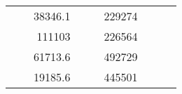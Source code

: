 \begin{table}[H]
\begin{tabular}{|ccrccrccc}
\multicolumn{1}{|c|}{\cellcolor[HTML]{FFFFC7}}                                & \multicolumn{1}{c|}{\cellcolor[HTML]{DAE8FC}}                      & \multicolumn{1}{r|}{\cellcolor[HTML]{DAE8FC}38346.1}   & \multicolumn{1}{c|}{\cellcolor[HTML]{FFFFC7}}                                & \multicolumn{1}{c|}{\cellcolor[HTML]{DAE8FC}}                       & \multicolumn{1}{r|}{\cellcolor[HTML]{DDFDFF}229274}    &                                                                              &                                                                    &                                                        \\ \cline{3-3} \cline{6-6}
\multicolumn{1}{|c|}{\cellcolor[HTML]{FFFFC7}}                                & \multicolumn{1}{c|}{\cellcolor[HTML]{DAE8FC}}                      & \multicolumn{1}{r|}{\cellcolor[HTML]{DDFDFF}111103}    & \multicolumn{1}{c|}{\cellcolor[HTML]{FFFFC7}}                                & \multicolumn{1}{c|}{\cellcolor[HTML]{DAE8FC}}                       & \multicolumn{1}{r|}{\cellcolor[HTML]{DAE8FC}226564}    &                                                                              &                                                                    &                                                        \\ \cline{3-3} \cline{6-6}
\multicolumn{1}{|c|}{\cellcolor[HTML]{FFFFC7}}                                & \multicolumn{1}{c|}{\cellcolor[HTML]{DAE8FC}}                      & \multicolumn{1}{r|}{\cellcolor[HTML]{DAE8FC}61713.6}   & \multicolumn{1}{c|}{\cellcolor[HTML]{FFFFC7}}                                & \multicolumn{1}{c|}{\cellcolor[HTML]{DAE8FC}}                       & \multicolumn{1}{r|}{\cellcolor[HTML]{DDFDFF}492729}    &                                                                              &                                                                    &                                                        \\ \cline{3-3} \cline{6-6}
\multicolumn{1}{|c|}{\cellcolor[HTML]{FFFFC7}}                                & \multicolumn{1}{c|}{\cellcolor[HTML]{DAE8FC}}                      & \multicolumn{1}{r|}{\cellcolor[HTML]{DDFDFF}19185.6}   & \multicolumn{1}{c|}{\cellcolor[HTML]{FFFFC7}}                                & \multicolumn{1}{c|}{\cellcolor[HTML]{DAE8FC}}                       & \multicolumn{1}{r|}{\cellcolor[HTML]{DAE8FC}445501}    &                                                                              &                                                                    &                                                        \\ \cline{3-3} \cline{6-6}

\end{tabular}
\end{table}
